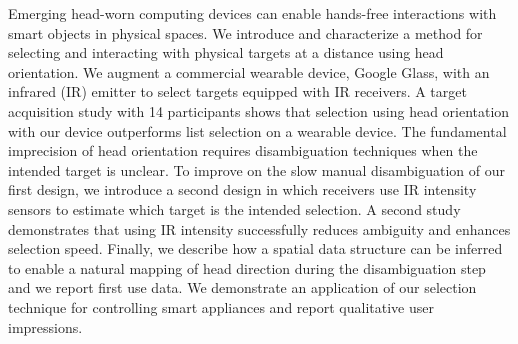 Emerging head-worn computing devices can enable hands-free interactions with smart objects in physical spaces. 
%
We introduce and characterize a method for selecting and interacting with physical targets at a distance using head orientation. We augment a commercial wearable device, Google Glass, with an infrared (IR) emitter to select targets equipped with IR receivers. A target acquisition study with 14 participants shows that selection using head orientation with our device outperforms list selection on a wearable device. The fundamental imprecision of head orientation requires disambiguation techniques when the intended target is unclear. To improve on the slow manual disambiguation of our first design, we introduce a second design in which receivers use IR intensity sensors to estimate which target is the intended selection. A second study demonstrates that using IR intensity successfully reduces ambiguity and enhances selection speed. Finally, we describe how a spatial data structure can be inferred to enable a natural mapping of head direction during the disambiguation step and we report first use data. 
We demonstrate an application of our selection technique for controlling smart appliances and report qualitative user impressions.